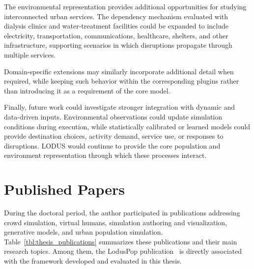 The environmental representation provides additional opportunities for studying interconnected urban services. The dependency mechanism evaluated with dialysis clinics and water-treatment facilities could be expanded to include electricity, transportation, communications, healthcare, shelters, and other infrastructure, supporting scenarios in which disruptions propagate through multiple services.

Domain-specific extensions may similarly incorporate additional detail when required, while keeping such behavior within the corresponding plugins rather than introducing it as a requirement of the core model.

Finally, future work could investigate stronger integration with dynamic and data-driven inputs. Environmental observations could update simulation conditions during execution, while statistically calibrated or learned models could provide destination choices, activity demand, service use, or responses to disruptions. LODUS would continue to provide the core population and environment representation through which these processes interact.


\section{Published Papers}
\label{sec:published_papers}

During the doctoral period, the author participated in publications addressing crowd simulation, virtual humans, simulation authoring and visualization, generative models, and urban population simulation. Table~\ref{tbl:thesis_publications} summarizes these publications and their main research topics. Among them, the LodusPop publication~\cite{silva2026lodusPop} is directly associated with the framework developed and evaluated in this thesis.


